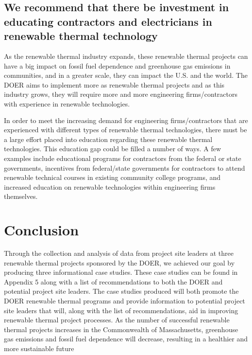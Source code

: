 \subsection{We recommend that there be investment in educating contractors and electricians in renewable thermal technology}
\par As the renewable thermal industry expands, these renewable thermal projects can have a big impact on fossil fuel dependence and greenhouse gas emissions in communities, and in a greater scale, they can impact the U.S. and the world. The DOER aims to implement more as renewable thermal projects and as this industry grows, they will require more and more engineering firms/contractors with experience in renewable technologies.
\par In order to meet the increasing demand for engineering firms/contractors that are experienced with different types of renewable thermal technologies, there must be a large effort placed into education regarding these renewable thermal technologies. This education gap could be filled a number of ways. A few examples include educational programs for contractors from the federal or state governments, incentives from federal/state governments for contractors to attend renewable technical courses in existing community college programs, and increased education on renewable technologies within engineering firms themselves.

\section{Conclusion}
\par Through the collection and analysis of data from project site leaders at three renewable thermal projects sponsored by the DOER, we achieved our goal  \goal by producing three informational case studies. These case studies can be found in Appendix 5 along with a list of recommendations to both the DOER and potential project site leaders. The case studies produced will both promote the DOER renewable thermal programs and provide information to potential project site leaders that will, along with the list of recommendations, aid in improving renewable thermal project processes. As the number of successful renewable thermal projects increases in the Commonwealth of Massachusetts, greenhouse gas emissions and fossil fuel dependence will decrease, resulting in a healthier and more sustainable future
